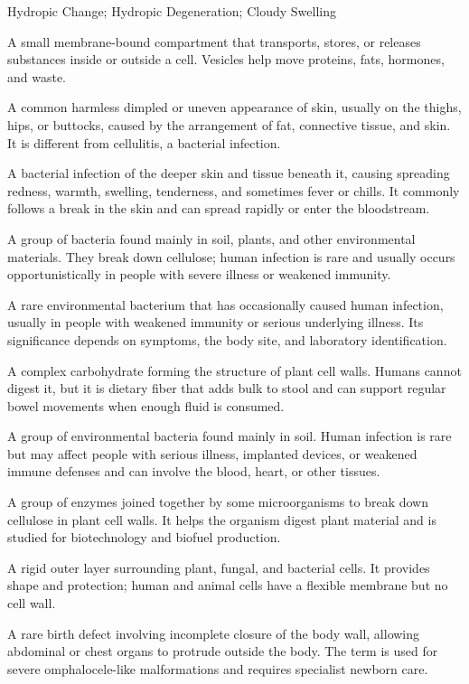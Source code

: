 \synonyms
Hydropic Change; Hydropic Degeneration; Cloudy Swelling

 A small membrane-bound compartment that transports, stores, or releases substances inside or outside a cell. Vesicles help move proteins, fats, hormones, and waste.

 A common harmless dimpled or uneven appearance of skin, usually on the thighs, hips, or buttocks, caused by the arrangement of fat, connective tissue, and skin. It is different from cellulitis, a bacterial infection.

 A bacterial infection of the deeper skin and tissue beneath it, causing spreading redness, warmth, swelling, tenderness, and sometimes fever or chills. It commonly follows a break in the skin and can spread rapidly or enter the bloodstream.

 A group of bacteria found mainly in soil, plants, and other environmental materials. They break down cellulose; human infection is rare and usually occurs opportunistically in people with severe illness or weakened immunity.

 A rare environmental bacterium that has occasionally caused human infection, usually in people with weakened immunity or serious underlying illness. Its significance depends on symptoms, the body site, and laboratory identification.

 A complex carbohydrate forming the structure of plant cell walls. Humans cannot digest it, but it is dietary fiber that adds bulk to stool and can support regular bowel movements when enough fluid is consumed.

 A group of environmental bacteria found mainly in soil. Human infection is rare but may affect people with serious illness, implanted devices, or weakened immune defenses and can involve the blood, heart, or other tissues.

 A group of enzymes joined together by some microorganisms to break down cellulose in plant cell walls. It helps the organism digest plant material and is studied for biotechnology and biofuel production.

 A rigid outer layer surrounding plant, fungal, and bacterial cells. It provides shape and protection; human and animal cells have a flexible membrane but no cell wall.

 A rare birth defect involving incomplete closure of the body wall, allowing abdominal or chest organs to protrude outside the body. The term is used for severe omphalocele-like malformations and requires specialist newborn care.

